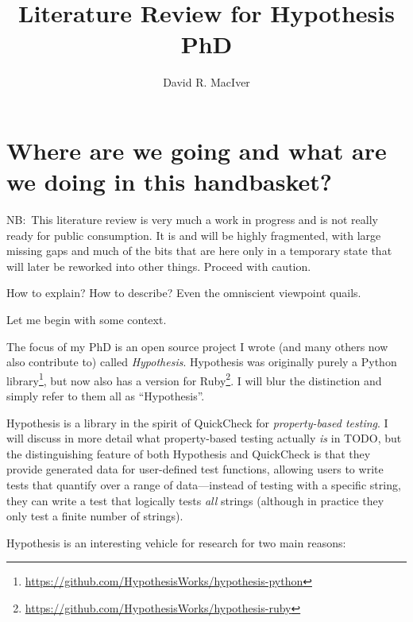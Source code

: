 

\title{Literature Review for Hypothesis PhD}
\author{David R. MacIver}



\maketitle

\tableofcontents

\chapter{Where are we going and what are we doing in this handbasket?}

NB:\ This literature review is very much a work in progress and is not really ready for public consumption.
It is and will be highly fragmented,
with large missing gaps and much of the bits that are here only in a temporary state that will later be reworked into other things.
Proceed with caution.

How to explain? How to describe? Even the omniscient viewpoint quails\cite{0812515285}.

Let me begin with some context.

The focus of my PhD is an open source project I wrote (and many others now also contribute to) called \emph{Hypothesis}.
Hypothesis was originally purely a Python library\footnote{\url{https://github.com/HypothesisWorks/hypothesis-python}},
but now also has a version for Ruby\footnote{\url{https://github.com/HypothesisWorks/hypothesis-ruby}}.
I will blur the distinction and simply refer to them all as ``Hypothesis''.

Hypothesis is a library in the spirit of QuickCheck\cite{DBLP:conf/icfp/ClaessenH00} for \emph{property-based testing}.
I will discuss in more detail what property-based testing actually \emph{is} in TODO,
but the distinguishing feature of both Hypothesis and QuickCheck is that they provide generated data for user-defined test functions,
allowing users to write tests that quantify over a range of data---instead
of testing with a specific string,
they can write a test that logically tests \emph{all} strings (although in practice they only test a finite number of strings).

Hypothesis is an interesting vehicle for research for two main reasons:

